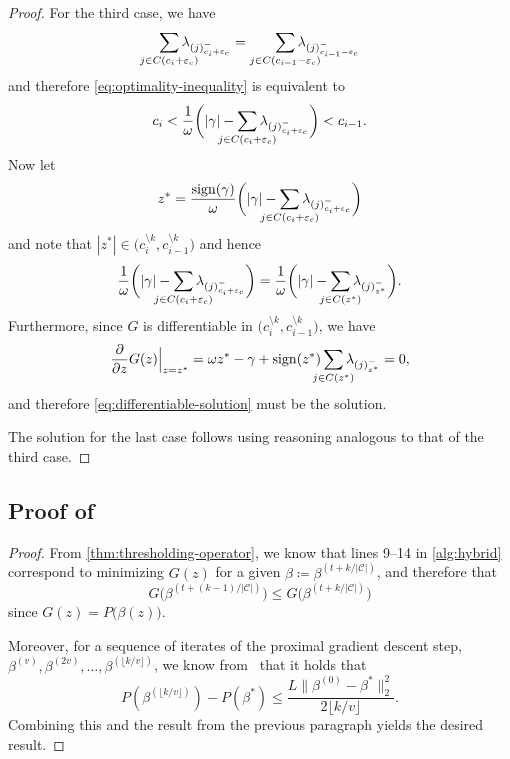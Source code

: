 \begin{proof}
  For the third case, we have
  \[
    \smashoperator{\sum_{j \in C(c_i + {\varepsilon_c})}} \lambda_{(j)^-_{c_i + {\varepsilon_c}}}
    =
    \smashoperator[r]{\sum_{j \in C(c_{i-1} - {\varepsilon_c})}} \lambda_{(j)^-_{c_{i-1} - {\varepsilon_c}}}
  \]
  and therefore \eqref{eq:optimality-inequality} is equivalent to
  \[
    c_i < \frac{1}{\omega} \bigg( |\gamma| - \smashoperator{\sum_{j \in C(c_i + {\varepsilon_c})}} \lambda_{(j)^-_{c_i + {\varepsilon_c}}} \bigg) < c_{i -1}.
  \]
  Now let
  \begin{equation}
    \label{eq:differentiable-solution}
    z^* = \frac{\sign(\gamma)}{\omega} \bigg( |\gamma| - \smashoperator{\sum_{j \in C(c_i + {\varepsilon_c})}} \lambda_{(j)^-_{c_i + {\varepsilon_c}}} \bigg)
  \end{equation}
  and note that \(|z^*| \in \big(c_i^{\setminus k}, c_{i-1}^{\setminus k}\big)\) and hence
  \[
    \frac{1}{\omega} \bigg( |\gamma| - \smashoperator{\sum_{j \in C(c_i + {\varepsilon_c})}} \lambda_{(j)^-_{c_i + {\varepsilon_c}}} \bigg)
    =
    \frac{1}{\omega} \bigg( |\gamma| - \smashoperator{\sum_{j \in C(z^*)}} \lambda_{(j)^-_{z^*}} \bigg).
  \]
  Furthermore, since \(G\) is differentiable in \(\big(c_i^{\setminus k}, c_{i-1}^{\setminus k}\big)\), we have
  \[
    \frac{\partial}{\partial z} G(z) \Big|_{z = z^*}
    = \omega z^* - \gamma + \sign(z^*) \smashoperator{\sum_{j \in C(z^*)}} \lambda_{(j)^-_{z^*}} = 0,
  \]
  and therefore \eqref{eq:differentiable-solution} must be the solution.

  The solution for the last case follows using reasoning analogous to that of the
  third case.
\end{proof}

\subsection{Proof of }

\begin{proof}
  From \cref{thm:thresholding-operator}, we know that lines 9--14 in \cref{alg:hybrid} correspond to minimizing \(G(z)\) for a given \(\beta \coloneqq \beta^{(t + k / |\mathcal{C}|)}\), and therefore that
  \[
    G\big(\beta^{(t + (k - 1) / |\mathcal{C}|)}\big) \leq G\big(\beta^{(t + k / |\mathcal{C}|)}\big)
  \]
  since \(G(z) = P\big(\beta(z)\big)\).

  Moreover, for a sequence of iterates of the proximal gradient descent step,
  \(\beta^{(v)}, \beta^{(2v)}, \dots, \beta^{(\lfloor k / v \rfloor)}\),
  we know from~\textcite[Theorem 3.1]{beck2009} that it holds that
  \[
    P(\beta^{(\lfloor k / v \rfloor)}) - P(\beta^*)
    \leq \frac{L \lVert \beta^{(0)} - \beta^* \rVert_2^2}{2\lfloor k / v \rfloor}.
  \]
  Combining this and the result from the previous paragraph yields the desired
  result.
\end{proof}
